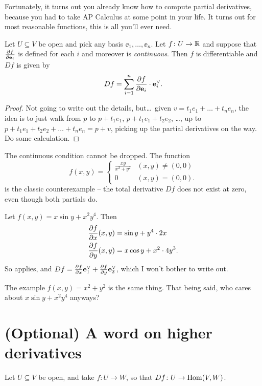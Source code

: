 Fortunately, it turns out you already know how to compute partial derivatives,
because you had to take AP Calculus at some point in your life.
It turns out for most reasonable functions, this is all you'll ever need.
\begin{theorem}
	\label{thm:apcalc_partials}
	Let $U \subseteq V$ be open and pick any basis $\ee_1, \dots, \ee_n$.
	Let $f \colon U \to \mathbb R$ and suppose that $\frac{\partial f}{\partial \mathbf e_i}$ is defined
	for each $i$ and moreover is \emph{continuous}.
	Then $f$ is differentiable and $Df$ is given by
	\[ Df = \sum_{i=1}^n \frac{\partial f}{\partial \mathbf e_i} \cdot \mathbf e_i^\vee. \]
\end{theorem}
\begin{proof}
	Not going to write out the details, but\dots\
	given $v = t_1e_1 + \dots + t_ne_n$,
	the idea is to just walk from $p$ to $p+t_1e_1$, $p+t_1e_1+t_2e_2$, \dots,
	up to $p+t_1e_1+t_2e_2+\dots+t_ne_n = p+v$,
	picking up the partial derivatives on the way.
	Do some calculation.
\end{proof}

\begin{remark}
	The continuous condition cannot be dropped. The function
	\[
		f(x,y)
		= \begin{cases}
			\frac{xy}{x^2+y^2} & (x,y) \neq (0,0) \\
			0 & (x,y) = (0,0).
		\end{cases}
	\]
	is the classic counterexample -- the total derivative $Df$ does not exist at zero,
	even though both partials do.
\end{remark}

\begin{example}
	Let $f(x,y) = x \sin y + x^2y^4$. Then
	\begin{align*}
		\frac{\partial f}{\partial x} (x,y) &= \sin y + y^4 \cdot 2x \\
		\frac{\partial f}{\partial y} (x,y) &= x \cos y + x^2 \cdot 4y^3.
	\end{align*}
	So  applies,
	and $Df = \frac{\partial f}{\partial x} \mathbf e_1^\vee + \frac{\partial f}{\partial y} \mathbf e_2^\vee$,
	which I won't bother to write out.
\end{example}

The example $f(x,y) = x^2+y^2$ is the same thing.
That being said, who cares about $x \sin y + x^2y^4$ anyways?

\section{(Optional) A word on higher derivatives}
Let $U \subseteq V$ be open, and take $f \colon U \to W$, so that $Df \colon U \to \operatorname{Hom}(V,W)$.

